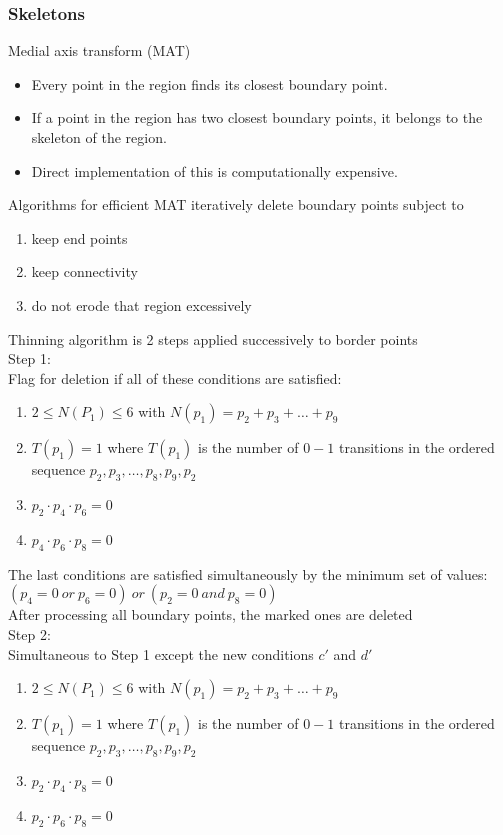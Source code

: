 \subsubsection{Skeletons}
Medial axis transform (MAT)
\begin{itemize}
\item Every point in the region finds its closest boundary point.
\item If a point in the region has two closest boundary points, it belongs to the skeleton of the region.
\item Direct implementation of this is computationally expensive.
\end{itemize}
Algorithms for efficient MAT iteratively delete boundary points subject to
\begin{enumerate}
\item keep end points
\item keep connectivity
\item do not erode that region excessively
\end{enumerate}
Thinning algorithm is 2 steps applied successively to border points\\
Step 1:\\
Flag for deletion if all of these conditions are satisfied:
\begin{enumerate} %
\item $2\leq N(P_1)\leq 6$ with $N(p_1)=p_2 + p_3 + \ldots + p_9$
\item $T(p_1)=1$ where $T(p_1)$ is the number of $0-1$ transitions in the ordered sequence $p_2,p_3,\ldots ,p_8,p_9,p_2$
\item $p_2 \cdot p_4 \cdot p_6 = 0$
\item $p_4 \cdot p_6 \cdot p_8 = 0$
\end{enumerate}
The last conditions are satisfied simultaneously by the minimum set of values: $(p_4=0\ or\ p_6=0)\ or \ (p_2=0\ and \ p_8=0)$\\
After processing all boundary points, the marked ones are deleted\\
Step 2:\\
Simultaneous to Step 1 except the new conditions $c'$ and $d'$\\
\begin{enumerate} %
\item $2\leq N(P_1)\leq 6$ with $N(p_1)=p_2 + p_3 + \ldots + p_9$
\item $T(p_1)=1$ where $T(p_1)$ is the number of $0-1$ transitions in the ordered sequence $p_2,p_3,\ldots ,p_8,p_9,p_2$
\item $p_2 \cdot p_4 \cdot p_8 = 0$
\item $p_2 \cdot p_6 \cdot p_8 = 0$
\end{enumerate}

